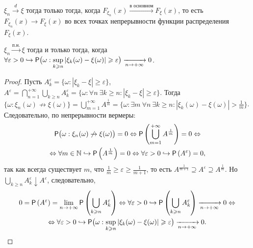  \begin{theorem}[Александрова][б/д]
 	$\xi_n \xrightarrow{d} \xi$ тогда только тогда, когда 
 	$F_{\xi_n}(x) \xrightarrow{\text{в основном}} F_\xi (x)$, то есть 
 	$F_{\xi_n}(x) \rightarrow F_\xi(x)$ во всех точках непрерывности 
 	функции распределения $F_\xi(x)$. 
 \end{theorem}
 \begin{lemma}
 	$\xi_n \xrightarrow{\text{п.н.}} \xi$ тогда и только тогда, когда $\forall \varepsilon > 0 \hookrightarrow \mathsf{P} \big(\omega: \sup\limits_{k \geqslant n} | \xi_k(\omega) - \xi(\omega) | \geqslant \varepsilon \big) \xrightarrow[n \rightarrow + \infty]{} 0$.
 	\begin{proof}
 		Пусть $A_k^\varepsilon = 
 		\big\{ \omega: | \xi_k - \xi | \geqslant \varepsilon \big\}$, $A^\varepsilon = 
 		\bigcap\limits_{n=1}^{+\infty} \bigcup\limits_{k \geqslant n} A_k^\varepsilon = 
 		\big\{\omega: \forall n~ \exists k \geqslant n: |\xi_k - \xi| \geqslant \varepsilon \big\}$. 
 		Тогда $\big\{ \omega: \xi_n (\omega) \not\rightarrow \xi(\omega) \big\} = 
 		\bigcup\limits_{m=1}^{+\infty} A^{\frac{1}{m}} = 
 		\big\{\omega: \exists m~ \forall n~ \exists k \geqslant n: | \xi_k(\omega) - \xi(\omega) | > \frac{1}{m} \big\}$. Следовательно, по непрерывности вермеры: 
 		\begin{multline*}
 			\mathsf{P} \big( \omega: \xi_n(\omega) \not\rightarrow \xi(\omega) \big) = 0 \Leftrightarrow \mathsf{P} \left( \bigcup\limits_{m = 1}^{+\infty} A^{\frac{1}{m}} \right) = 0 \Leftrightarrow \\ \Leftrightarrow \forall m \in \mathbb{N} \hookrightarrow \mathsf{P} \left( A^{\frac{1}{m}} \right) = 0  \Leftrightarrow \forall \varepsilon > 0 \hookrightarrow \mathsf{P}  \left( A^\varepsilon \right) = 0,
 		\end{multline*}
 		так как всегда существует $m$, что $\frac{1}{m} \geqslant \varepsilon \geqslant \frac{1}{m+1}$, то есть $A^{\frac{1}{m+1}} \supseteq A^\varepsilon \supseteq A^{\frac{1}{m}}$. Но $\bigcup\limits_{k \geqslant n} A^\varepsilon_k \downarrow A^\varepsilon$, следовательно, 
 		\begin{multline*}
 			0 = \mathsf{P} \left( A^\varepsilon \right) = 
 			\lim\limits_{n \rightarrow + \infty} \mathsf{P} \left( \bigcup_{k \geqslant n} A^\varepsilon_k \right) \Leftrightarrow
 			\forall \varepsilon > 0 \hookrightarrow \mathsf{P} \left( \bigcup\limits_{k \geqslant n} A^\varepsilon_k \right) \xrightarrow[n \rightarrow + \infty]{} 0 \Leftrightarrow \\ 
 			\Leftrightarrow  \forall \varepsilon > 0 \hookrightarrow  \mathsf{P} \big(\omega: \sup\limits_{k \geqslant n} | \xi_k(\omega) - \xi(\omega) | \geqslant \varepsilon \big) \xrightarrow[n \rightarrow + \infty]{} 0.
 		\end{multline*}
 	\end{proof}
 \end{lemma}
 
